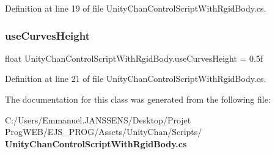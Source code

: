 Definition at line 19 of file Unity\+Chan\+Control\+Script\+With\+Rgid\+Body.\+cs.

\mbox{\label{class_unity_chan_control_script_with_rgid_body_ac173093871ee276eaac977ec8db9f9ba}} 
\subsubsection{use\+Curves\+Height}
{\footnotesize\ttfamily float Unity\+Chan\+Control\+Script\+With\+Rgid\+Body.\+use\+Curves\+Height = 0.\+5f}



Definition at line 21 of file Unity\+Chan\+Control\+Script\+With\+Rgid\+Body.\+cs.



The documentation for this class was generated from the following file\+:\begin{DoxyCompactItemize}
\item 
C\+:/\+Users/\+Emmanuel.\+J\+A\+N\+S\+S\+E\+N\+S/\+Desktop/\+Projet Prog\+W\+E\+B/\+E\+J\+S\+\_\+\+P\+R\+O\+G/\+Assets/\+Unity\+Chan/\+Scripts/\textbf{ Unity\+Chan\+Control\+Script\+With\+Rgid\+Body.\+cs}\end{DoxyCompactItemize}
